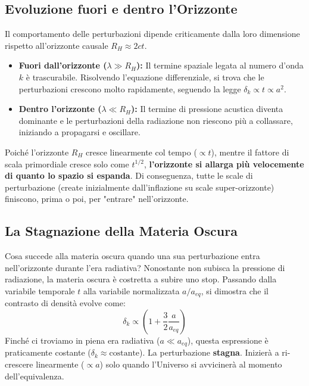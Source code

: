 \documentclass[11pt,a4paper]{report}
\begin{document}
\subsection{Evoluzione fuori e dentro l'Orizzonte}
Il comportamento delle perturbazioni dipende criticamente dalla loro dimensione rispetto all'orizzonte causale $R_H \approx 2ct$.
\begin{itemize}
    \item \textbf{Fuori dall'orizzonte ($\lambda \gg R_H$):} Il termine spaziale legata al numero d'onda $k$ è trascurabile. Risolvendo l'equazione differenziale, si trova che le perturbazioni crescono molto rapidamente, seguendo la legge $\delta_k \propto t \propto a^2$.
    \item \textbf{Dentro l'orizzonte ($\lambda \ll R_H$):} Il termine di pressione acustica diventa dominante e le perturbazioni della radiazione non riescono più a collassare, iniziando a propagarsi e oscillare.
\end{itemize}
Poiché l'orizzonte $R_H$ cresce linearmente col tempo ($\propto t$), mentre il fattore di scala primordiale cresce solo come $t^{1/2}$, \textbf{l'orizzonte si allarga più velocemente di quanto lo spazio si espanda}. Di conseguenza, tutte le scale di perturbazione (create inizialmente dall'inflazione su scale super-orizzonte) finiscono, prima o poi, per "entrare" nell'orizzonte.

\subsection{La Stagnazione della Materia Oscura}
Cosa succede alla materia oscura quando una sua perturbazione entra nell'orizzonte durante l'era radiativa?
Nonostante non subisca la pressione di radiazione, la materia oscura è costretta a subire uno stop. Passando dalla variabile temporale $t$ alla variabile normalizzata $a/a_{eq}$, si dimostra che il contrasto di densità evolve come:
\begin{equation}
\delta_k \propto \left( 1 + \frac{3}{2}\frac{a}{a_{eq}} \right)
\end{equation}
Finché ci troviamo in piena era radiativa ($a \ll a_{eq}$), questa espressione è praticamente costante ($\delta_k \approx \text{costante}$). La perturbazione \textbf{stagna}. Inizierà a ri-crescere linearmente ($\propto a$) solo quando l'Universo si avvicinerà al momento dell'equivalenza.
\end{document}
